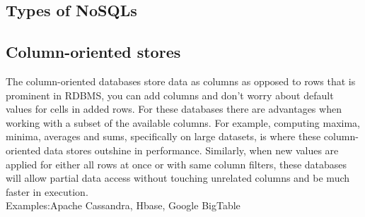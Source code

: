 \documentclass[a0,landscape]{a0poster}
\begin{document}
\begin{multicols}{4}

\color{DarkSlateGray} %

\section*{Types of NoSQLs}
\par

% 
% 
% 
% 
% 
 \color{DarkSlateGray} 
\subsection*{Column-oriented stores}

\justifying 
{The column-oriented databases store data as columns as opposed to rows that
is prominent in RDBMS, you can add columns and don't worry about default values for cells in added rows. For these databases there are advantages when working with a subset of the available columns. For example, computing maxima, minima, averages and sums, specifically on large
datasets, is where these column-oriented data stores outshine in performance.
Similarly, when new values are applied for either all rows at once or with same 
column filters, these databases will allow partial data access without touching
unrelated columns and be much faster in execution.\\
Examples:Apache Cassandra, Hbase, Google BigTable
}


\end{multicols}
\end{document}
